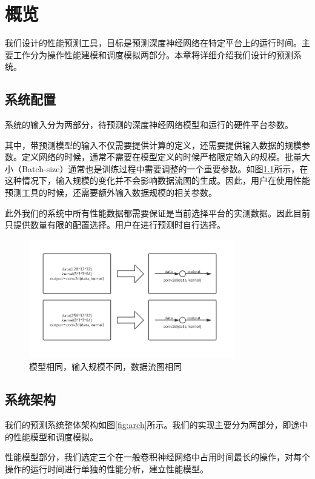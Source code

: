 \chapter{概览}
\label{cap:overview}
    我们设计的性能预测工具，目标是预测深度神经网络在特定平台上的运行时间。主要工作分为操作性能建模和调度模拟两部分。本章将详细介绍我们设计的预测系统。
    
\section{系统配置}
    系统的输入分为两部分，待预测的深度神经网络模型和运行的硬件平台参数。
    
    其中，带预测模型的输入不仅需要提供计算的定义，还需要提供输入数据的规模参数。定义网络的时候，通常不需要在模型定义的时候严格限定输入的规模。批量大小（Batch-size）通常也是训练过程中需要调整的一个重要参数。如图\ref{fig:dag_same}所示，在这种情况下，输入规模的变化并不会影响数据流图的生成。因此，用户在使用性能预测工具的时候，还需要额外输入数据规模的相关参数。

    此外我们的系统中所有性能数据都需要保证是当前选择平台的实测数据。因此目前只提供数量有限的配置选择。用户在进行预测时自行选择。

    \begin{figure}[!htbp]
        \centering
        \includegraphics[width=0.8\textwidth]{figures/dag_same.jpg}
        \caption{模型相同，输入规模不同，数据流图相同}
        \label{fig:dag_same}
    \end{figure}
    
    
\section{系统架构}
    我们的预测系统整体架构如图\ref{fig:arch}所示。我们的实现主要分为两部分，即途中的性能模型和调度模拟。
    
    性能模型部分，我们选定三个在一般卷积神经网络中占用时间最长的操作，对每个操作的运行时间进行单独的性能分析，建立性能模型。
    
